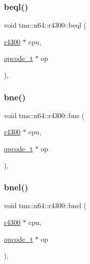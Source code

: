 \mbox{\label{classtms_1_1n64_1_1r4300_acd95d337c018c595da5cdd3807877947}} 
\subsubsection{\texorpdfstring{beql()}{beql()}}
{\footnotesize\ttfamily void tms\+::n64\+::r4300\+::beql (\begin{DoxyParamCaption}\item[{\hyperlink{classtms_1_1n64_1_1r4300}{r4300} $\ast$}]{cpu,  }\item[{\hyperlink{classtms_1_1n64_1_1opcode__t}{opcode\+\_\+t} $\ast$}]{op }\end{DoxyParamCaption})\hspace{0.3cm}{\ttfamily [static]}, {\ttfamily [private]}}

\mbox{\label{classtms_1_1n64_1_1r4300_a7d8a090db23193966f9fa0f6fa5a5756}} 
\subsubsection{\texorpdfstring{bne()}{bne()}}
{\footnotesize\ttfamily void tms\+::n64\+::r4300\+::bne (\begin{DoxyParamCaption}\item[{\hyperlink{classtms_1_1n64_1_1r4300}{r4300} $\ast$}]{cpu,  }\item[{\hyperlink{classtms_1_1n64_1_1opcode__t}{opcode\+\_\+t} $\ast$}]{op }\end{DoxyParamCaption})\hspace{0.3cm}{\ttfamily [static]}, {\ttfamily [private]}}

\mbox{\label{classtms_1_1n64_1_1r4300_a16d00db0478d05ae09964446de65fa22}} 
\subsubsection{\texorpdfstring{bnel()}{bnel()}}
{\footnotesize\ttfamily void tms\+::n64\+::r4300\+::bnel (\begin{DoxyParamCaption}\item[{\hyperlink{classtms_1_1n64_1_1r4300}{r4300} $\ast$}]{cpu,  }\item[{\hyperlink{classtms_1_1n64_1_1opcode__t}{opcode\+\_\+t} $\ast$}]{op }\end{DoxyParamCaption})\hspace{0.3cm}{\ttfamily [static]}, {\ttfamily [private]}}

